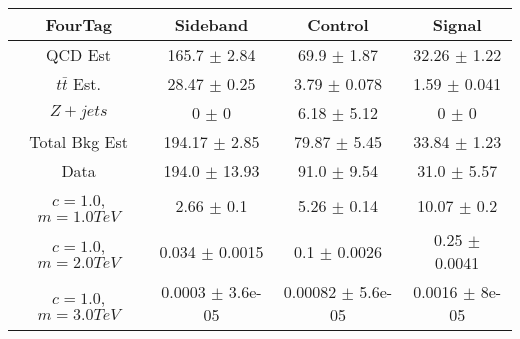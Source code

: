 \begin{footnotesize} 
\begin{tabular}{c|c|c|c} 
FourTag & Sideband & Control & Signal \\ 
\hline\hline 
QCD Est & 165.7 $\pm$ 2.84 & 69.9 $\pm$ 1.87 & 32.26 $\pm$ 1.22\\ 
$t\bar{t}$ Est.  & 28.47 $\pm$ 0.25 & 3.79 $\pm$ 0.078 & 1.59 $\pm$ 0.041\\ 
$Z+jets$ & 0 $\pm$ 0 & 6.18 $\pm$ 5.12 & 0 $\pm$ 0\\ 
Total Bkg Est & 194.17 $\pm$ 2.85 & 79.87 $\pm$ 5.45 & 33.84 $\pm$ 1.23\\ 
Data & 194.0 $\pm$ 13.93 & 91.0 $\pm$ 9.54 & 31.0 $\pm$ 5.57\\ 
$c=1.0$,$m=1.0TeV$ & 2.66 $\pm$ 0.1 & 5.26 $\pm$ 0.14 & 10.07 $\pm$ 0.2\\ 
$c=1.0$,$m=2.0TeV$ & 0.034 $\pm$ 0.0015 & 0.1 $\pm$ 0.0026 & 0.25 $\pm$ 0.0041\\ 
$c=1.0$,$m=3.0TeV$ & 0.0003 $\pm$ 3.6e-05 & 0.00082 $\pm$ 5.6e-05 & 0.0016 $\pm$ 8e-05\\ 
\hline\hline 
\end{tabular} 
\end{footnotesize} 
\newline 
